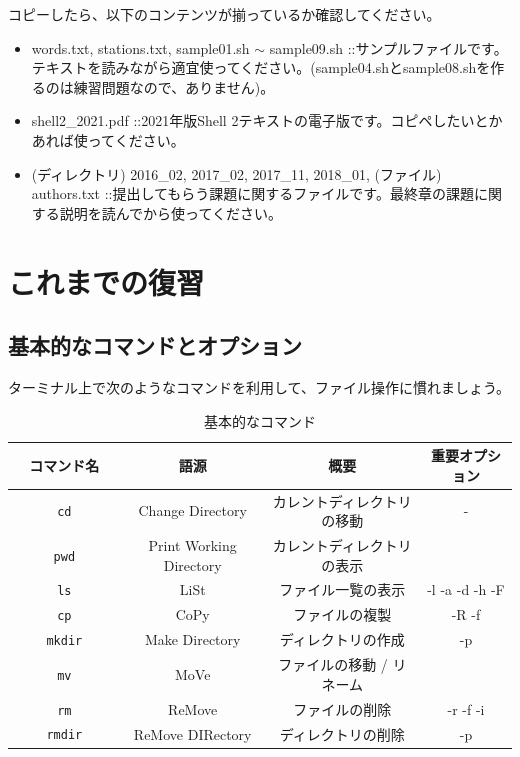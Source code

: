 \documentclass[a4j]{ltjsreport}
\begin{document}
    コピーしたら、以下のコンテンツが揃っているか確認してください。

    \begin{itemize}
        \item words.txt, stations.txt, sample01.sh $\sim$ sample09.sh ::サンプルファイルです。テキストを読みながら適宜使ってください。(sample04.shとsample08.shを作るのは練習問題なので、ありません)。
        \item shell2\_2021.pdf ::2021年版Shell 2テキストの電子版です。コピペしたいとかあれば使ってください。
        \item (ディレクトリ) 2016\_02, 2017\_02, 2017\_11, 2018\_01, (ファイル) authors.txt ::提出してもらう課題に関するファイルです。最終章の課題に関する説明を読んでから使ってください。
    \end{itemize}


    \tableofcontents

    \chapter{これまでの復習}
    \section{基本的なコマンドとオプション}
    ターミナル上で次のようなコマンドを利用して、ファイル操作に慣れましょう。
    \begin{table}[htbp]
        \centering
        \caption{基本的なコマンド}
        \label{tab:command}
        \begin{tabular}{cccc}
            \hline
            \hline
            コマンド名　　　& 語源                     & 概要                       &  重要オプション \\
            \hline
            \texttt{cd}    &  Change Directory        & カレントディレクトリの移動 & - \\
            \texttt{pwd}   &  Print Working Directory & カレントディレクトリの表示 & \\
            \texttt{ls}    &  LiSt                    & ファイル一覧の表示         &	   -l -a -d -h -F \\
            \texttt{cp}    &  CoPy                    & ファイルの複製             &	      -R -f \\
            \texttt{mkdir} &  Make Directory          & ディレクトリの作成         &	      -p \\
            \texttt{mv}    &  MoVe                    & ファイルの移動 / リネーム  & \\
            \texttt{rm}    &  ReMove                  & ファイルの削除             &	      -r -f -i \\
            \texttt{rmdir} &  ReMove DIRectory        & ディレクトリの削除         &	      -p \\
            \hline
            \hline
        \end{tabular}
    \end{table}
\end{document}
